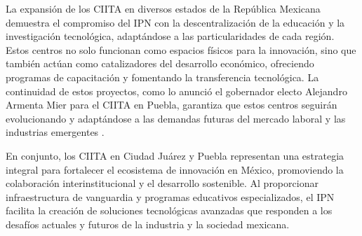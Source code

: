 La expansión de los CIITA en diversos estados de la República Mexicana demuestra el compromiso del IPN con la descentralización de la educación y la investigación tecnológica, adaptándose a las particularidades de cada región. Estos centros no solo funcionan como espacios físicos para la innovación, sino que también actúan como catalizadores del desarrollo económico, ofreciendo programas de capacitación y fomentando la transferencia tecnológica. La continuidad de estos proyectos, como lo anunció el gobernador electo Alejandro Armenta Mier para el CIITA en Puebla, garantiza que estos centros seguirán evolucionando y adaptándose a las demandas futuras del mercado laboral y las industrias emergentes \cite{diario_cambio_citta_puebla}.

En conjunto, los CIITA en Ciudad Juárez y Puebla representan una estrategia integral para fortalecer el ecosistema de innovación en México, promoviendo la colaboración interinstitucional y el desarrollo sostenible. Al proporcionar infraestructura de vanguardia y programas educativos especializados, el IPN facilita la creación de soluciones tecnológicas avanzadas que responden a los desafíos actuales y futuros de la industria y la sociedad mexicana.